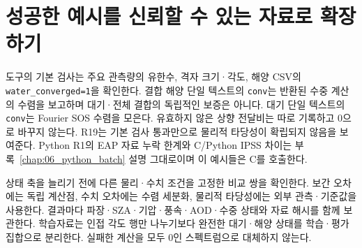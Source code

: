 \section{성공한 예시를 신뢰할 수 있는 자료로 확장하기}
\label{sec:auto:09_cookbook:8}

도구의 기본 검사는 주요 관측량의 유한수, 격자 크기·각도, 해양 CSV의 \texttt{water\_\allowbreak{}converged=\allowbreak{}1}을 확인한다. 결합 해양 단일 텍스트의 \texttt{conv}는 반환된 수중 계산의 수렴을 보고하며 대기·전체 결합의 독립적인 보증은 아니다. 대기 단일 텍스트의 \texttt{conv}는 Fourier SOS 수렴을 모은다. 유효하지 않은 상향 전달비는 따로 기록하고 0으로 바꾸지 않는다. R19는 기본 검사 통과만으로 물리적 타당성이 확립되지 않음을 보여준다. Python R1의 EAP 자료 누락 한계와 C/Python IPSS 차이는 부록~\ref{chap:06_python_batch} 설명 그대로이며 이 예시들은 C를 호출한다.

상태 축을 늘리기 전에 다른 물리·수치 조건을 고정한 비교 쌍을 확인한다. 보간 오차에는 독립 계산점, 수치 오차에는 수렴 세분화, 물리적 타당성에는 외부 관측·기준값을 사용한다. 결과마다 파장·SZA·기압·풍속·AOD·수중 상태와 자료 해시를 함께 보관한다. 학습자료는 인접 각도 행만 나누기보다 완전한 대기·해양 상태를 학습·평가 집합으로 분리한다. 실패한 계산을 모두 0인 스펙트럼으로 대체하지 않는다.
